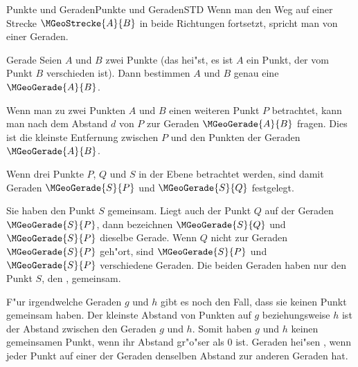 \begin{MXContent}{Punkte und Geraden}{Punkte und Geraden}{STD}
Wenn man den Weg auf einer Strecke $\MGeoStrecke{A}{B}$ in beide Richtungen 
fortsetzt, spricht man von einer Geraden.

\begin{MXInfo}{Gerade}
Seien $A$ und $B$ zwei Punkte (das hei"st, es ist $A$ ein Punkt, der vom 
Punkt $B$ verschieden ist). Dann bestimmen $A$ und $B$ genau eine 
 $\MGeoGerade{A}{B}$.
\end{MXInfo}
Wenn man zu zwei Punkten $A$ und $B$ einen weiteren Punkt $P$ betrachtet,
kann man nach dem Abstand $d$ von $P$ zur Geraden $\MGeoGerade{A}{B}$ fragen.
Dies ist die kleinste Entfernung zwischen $P$ und den Punkten der Geraden
$\MGeoGerade{A}{B}$.

\begin{center}
\end{center}

Wenn drei Punkte $P$, $Q$ und $S$ in der Ebene betrachtet werden, sind damit
Geraden $\MGeoGerade{S}{P}$ und $\MGeoGerade{S}{Q}$ festgelegt.

Sie haben den Punkt $S$ gemeinsam. Liegt auch der Punkt $Q$ auf der Geraden 
$\MGeoGerade{S}{P}$, dann bezeichnen $\MGeoGerade{S}{Q}$ und $\MGeoGerade{S}{P}$
dieselbe Gerade. 
Wenn $Q$ nicht zur Geraden $\MGeoGerade{S}{P}$ geh"ort, sind $\MGeoGerade{S}{P}$
und $\MGeoGerade{S}{P}$ verschiedene Geraden. Die beiden Geraden haben nur 
den Punkt $S$, den , gemeinsam.

F"ur irgendwelche Geraden $g$ und $h$ gibt es noch den Fall, dass sie keinen 
Punkt gemeinsam haben. Der kleinste Abstand von Punkten auf $g$ beziehungsweise
$h$ ist der Abstand zwischen den Geraden $g$ und $h$. Somit haben $g$ und $h$
keinen gemeinsamen Punkt, wenn ihr Abstand gr"o"ser als $0$ ist.
Geraden hei"sen , wenn jeder Punkt auf einer der 
Geraden denselben Abstand zur anderen Geraden hat.


\end{MXContent}
